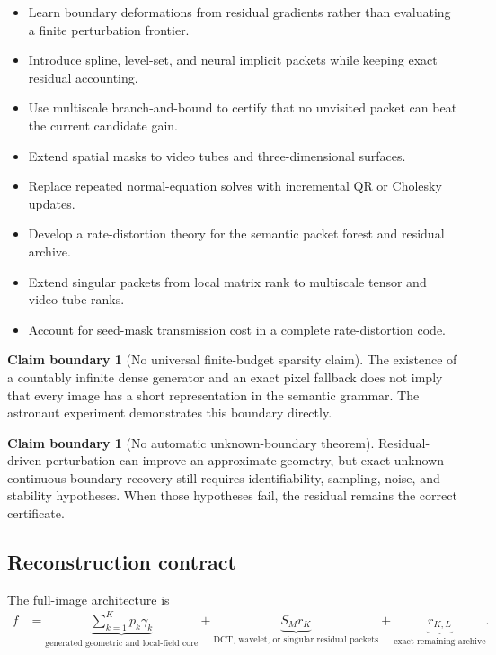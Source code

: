 \documentclass[11pt]{article}
\theoremstyle{definition}
\newtheorem{boundary}[theorem]{Claim boundary}
\theoremstyle{remark}
\begin{document}
\begin{itemize}
\item Learn boundary deformations from residual gradients rather than evaluating a finite perturbation frontier.
\item Introduce spline, level-set, and neural implicit packets while keeping exact residual accounting.
\item Use multiscale branch-and-bound to certify that no unvisited packet can beat the current candidate gain.
\item Extend spatial masks to video tubes and three-dimensional surfaces.
\item Replace repeated normal-equation solves with incremental QR or Cholesky updates.
\item Develop a rate-distortion theory for the semantic packet forest and residual archive.
\item Extend singular packets from local matrix rank to multiscale tensor and video-tube ranks.
\item Account for seed-mask transmission cost in a complete rate-distortion code.
\end{itemize}

\begin{boundary}[No universal finite-budget sparsity claim]
The existence of a countably infinite dense generator and an exact pixel fallback does not imply that every image has a short representation in the semantic grammar. The astronaut experiment demonstrates this boundary directly.
\end{boundary}

\begin{boundary}[No automatic unknown-boundary theorem]
Residual-driven perturbation can improve an approximate geometry, but exact unknown continuous-boundary recovery still requires identifiability, sampling, noise, and stability hypotheses. When those hypotheses fail, the residual remains the correct certificate.
\end{boundary}

\FloatBarrier
\subsection{Reconstruction contract}
The full-image architecture is
\[
\boxed{
\begin{aligned}
f
&=
\underbrace{\sum_{k=1}^{K}p_k\gamma_k}_{\text{generated geometric and local-field core}}
+
\underbrace{S_Mr_K}_{\text{DCT, wavelet, or singular residual packets}}
+
\underbrace{r_{K,L}}_{\text{exact remaining archive}}.
\end{aligned}
}
\]
\end{document}
